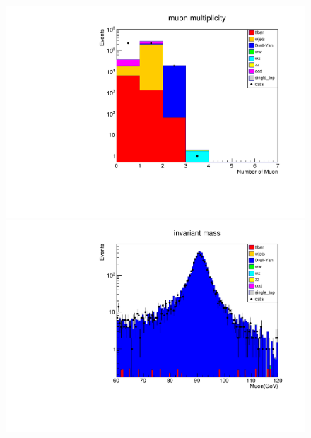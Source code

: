 \documentclass[11pt]{article}
\begin{document}
\begin{figure}[h]
\centering
\includegraphics[width=15cm]{STACK_multi.pdf}
\qquad
\includegraphics[width=15cm]{STACK_invmass.pdf}
\end{figure}
\end{document}
